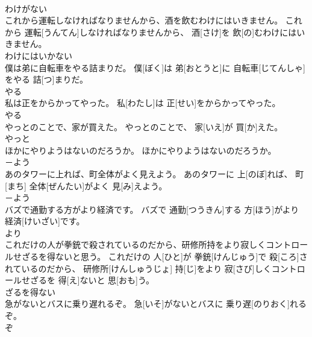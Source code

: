 \documentclass[8pt]{extreport}
\begin{document}
\begin{CJK}{UTF8}{min}
\\	わけがない	
\\	これから運転しなければなりませんから、酒を飲むわけにはいきません。	これから 運転[うんてん]しなければなりませんから、 酒[さけ]を 飲[の]むわけにはいきません。	
\\	わけにはいかない	
\\	僕は弟に自転車をやる詰まりだ。	僕[ぼく]は 弟[おとうと]に 自転車[じてんしゃ]をやる 詰[つ]まりだ。	
\\	やる 
\\	私は正をからかってやった。	私[わたし]は 正[せい]をからかってやった。	
\\	やる 
\\	やっとのことで、家が買えた。	やっとのことで、 家[いえ]が 買[か]えた。	
\\	やっと	
\\	ほかにやりようはないのだろうか。	ほかにやりようはないのだろうか。	
\\	－よう 
\\	あのタワーに上れば、町全体がよく見えよう。	あのタワーに 上[のぼ]れば、 町[まち] 全体[ぜんたい]がよく 見[み]えよう。	
\\	－よう 
\\	バズで通勤する方がより経済です。	バズで 通勤[つうきん]する 方[ほう]がより 経済[けいざい]です。	
\\	より	
\\	これだけの人が拳銃で殺されているのだから、研修所持をより寂しくコントロールせざるを得ないと思う。	これだけの 人[ひと]が 拳銃[けんじゅう]で 殺[ころ]されているのだから、 研修所[けんしゅうじょ] 持[じ]をより 寂[さび]しくコントロールせざるを 得[え]ないと 思[おも]う。	
\\	ざるを得ない	
\\	急がないとバスに乗り遅れるぞ。	急[いそ]がないとバスに 乗り遅[のりおく]れるぞ。	
\\	ぞ	
\end{CJK}
\end{document}
